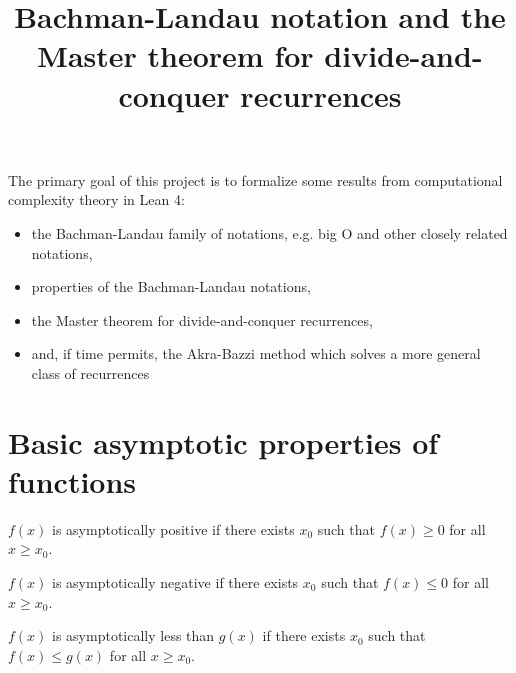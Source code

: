 %

\title{Bachman-Landau notation and the Master theorem for divide-and-conquer recurrences}

The primary goal of this project is to formalize some results from computational 
complexity theory in Lean 4:
\begin{itemize}
\item the Bachman-Landau family of notations, e.g. big O and other closely related notations,
\item properties of the Bachman-Landau notations,
\item the Master theorem for divide-and-conquer recurrences,
\item and, if time permits, the Akra-Bazzi method which solves a more general class of recurrences
\end{itemize}

\section{Basic asymptotic properties of functions}

\begin{definition}
    \label{def:asymp_pos}
    \leanok
    $f(x)$ is asymptotically positive if there exists $x_0$ such that $f(x) \ge 0$
    for all $x \ge x_0$.

\end{definition}

\begin{definition}
    \label{def:asymp_neg}
    \leanok
    $f(x)$ is asymptotically negative if there exists $x_0$ such that $f(x) \le 0$
    for all $x \ge x_0$.

\end{definition}

\begin{definition}
    \label{def:asymp_le}
    \leanok
    $f(x)$ is asymptotically less than $g(x)$ if there exists $x_0$ such that
    $f(x) \le g(x)$ for all $x \ge x_0$.

\end{definition}

